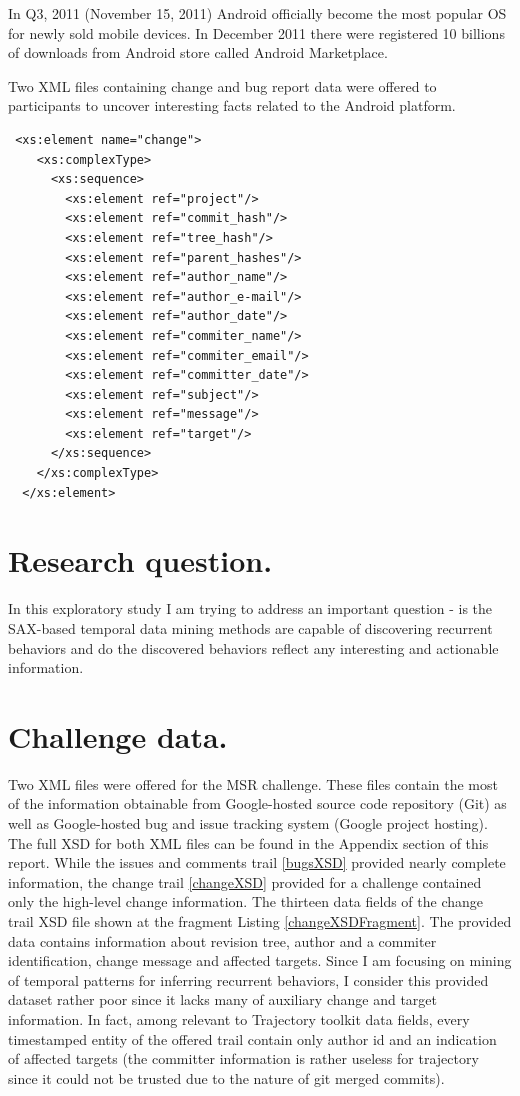 \documentclass[a4paper,10pt]{article}
\numberwithin{equation}{subsection}
\begin{document}
In Q3, 2011 (November 15, 2011) Android officially become the most popular OS for newly sold mobile 
devices. In December 2011 there were registered 10 billions of downloads from Android store called
Android Marketplace. 

Two XML files containing change and bug report 
data were offered to participants to uncover interesting facts related to the Android platform.

\lstset{label=changeXSDFragment,caption=List of metadata provided by change trail XML (fragment) }
\begin{lstlisting}
 <xs:element name="change">
    <xs:complexType>
      <xs:sequence>
        <xs:element ref="project"/>
        <xs:element ref="commit_hash"/>
        <xs:element ref="tree_hash"/>
        <xs:element ref="parent_hashes"/>
        <xs:element ref="author_name"/>
        <xs:element ref="author_e-mail"/>
        <xs:element ref="author_date"/>
        <xs:element ref="commiter_name"/>
        <xs:element ref="commiter_email"/>
        <xs:element ref="committer_date"/>
        <xs:element ref="subject"/>
        <xs:element ref="message"/>
        <xs:element ref="target"/>
      </xs:sequence>
    </xs:complexType>
  </xs:element>
\end{lstlisting}

\section{Research question.}
In this exploratory study I am trying to address an important question - is the SAX-based temporal data
mining methods are capable of discovering recurrent behaviors and do the discovered behaviors reflect 
any interesting and actionable information.

\section{Challenge data.}
Two XML files were offered for the MSR challenge. These files contain the most of the information
obtainable from Google-hosted source code repository (Git) as well as Google-hosted bug and issue
tracking system (Google project hosting). 
The full XSD for both XML files can be found in the Appendix section of this report.
While the issues and comments trail \ref{bugsXSD} provided nearly complete information,
the change trail \ref{changeXSD} provided for a challenge contained only the high-level change information.
The thirteen data fields of the change trail XSD file shown at the fragment Listing \ref{changeXSDFragment}. 
The provided data contains information about revision tree, author and a commiter identification, change
message and affected targets.
Since I am focusing on mining of temporal patterns for inferring recurrent behaviors, I consider 
this provided dataset rather poor since it lacks many of auxiliary change and target information. 
In fact, among relevant to Trajectory toolkit data fields, every timestamped entity of the offered trail
contain only author id and an indication of affected targets (the committer information
is rather useless for trajectory since it could not be trusted due to the nature of git merged commits).   
\end{document}
